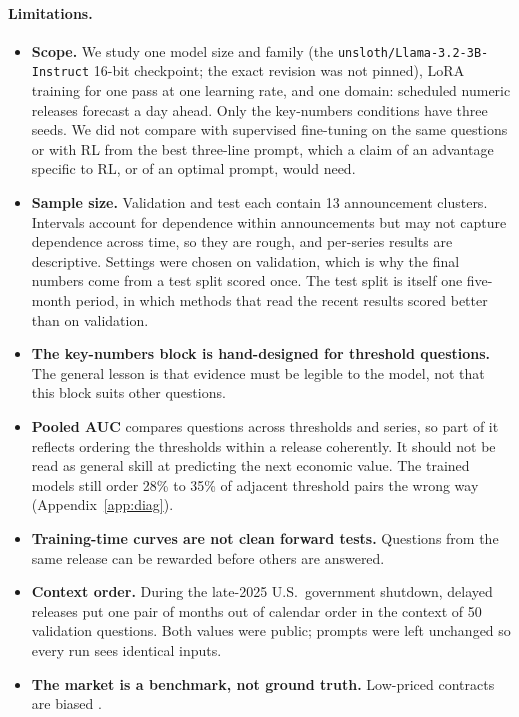 \documentclass[11pt]{article}
\begin{document}
\paragraph{Limitations.}
\begin{itemize}[leftmargin=*]
\item \textbf{Scope.} We study one model size and family (the \texttt{unsloth/Llama-3.2-3B-Instruct} 16-bit checkpoint; the exact revision was not pinned), LoRA training for one pass at one learning rate, and one domain: scheduled numeric releases forecast a day ahead. Only the key-numbers conditions have three seeds. We did not compare with supervised fine-tuning on the same questions or with RL from the best three-line prompt, which a claim of an advantage specific to RL, or of an optimal prompt, would need.
\item \textbf{Sample size.} Validation and test each contain 13 announcement clusters. Intervals account for dependence within announcements but may not capture dependence across time, so they are rough, and per-series results are descriptive. Settings were chosen on validation, which is why the final numbers come from a test split scored once. The test split is itself one five-month period, in which methods that read the recent results scored better than on validation.
\item \textbf{The key-numbers block is hand-designed for threshold questions.} The general lesson is that evidence must be legible to the model, not that this block suits other questions.
\item \textbf{Pooled AUC} compares questions across thresholds and series, so part of it reflects ordering the thresholds within a release coherently. It should not be read as general skill at predicting the next economic value. The trained models still order 28\% to 35\% of adjacent threshold pairs the wrong way (Appendix~\ref{app:diag}).
\item \textbf{Training-time curves are not clean forward tests.} Questions from the same release can be rewarded before others are answered.
\item \textbf{Context order.} During the late-2025 U.S.\ government shutdown, delayed releases put one pair of months out of calendar order in the context of 50 validation questions. Both values were public; prompts were left unchanged so every run sees identical inputs.
\item \textbf{The market is a benchmark, not ground truth.} Low-priced contracts are biased \citep{burgi2026makers}.
\end{itemize}
\end{document}
